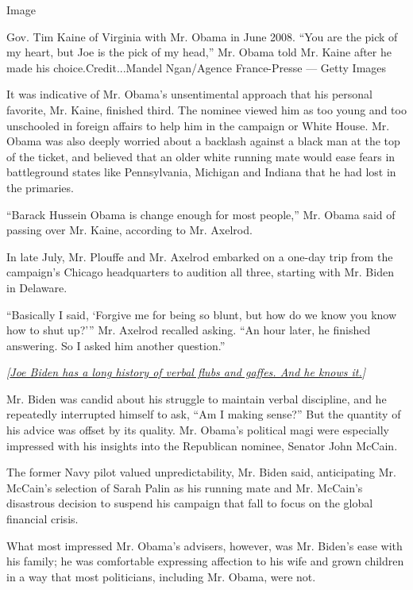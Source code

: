 Image

Gov. Tim Kaine of Virginia with Mr. Obama in June 2008. ``You are the
pick of my heart, but Joe is the pick of my head,'' Mr. Obama told Mr.
Kaine after he made his choice.Credit...Mandel Ngan/Agence France-Presse
--- Getty Images

It was indicative of Mr. Obama's unsentimental approach that his
personal favorite, Mr. Kaine, finished third. The nominee viewed him as
too young and too unschooled in foreign affairs to help him in the
campaign or White House. Mr. Obama was also deeply worried about a
backlash against a black man at the top of the ticket, and believed that
an older white running mate would ease fears in battleground states like
Pennsylvania, Michigan and Indiana that he had lost in the primaries.

``Barack Hussein Obama is change enough for most people,'' Mr. Obama
said of passing over Mr. Kaine, according to Mr. Axelrod.

In late July, Mr. Plouffe and Mr. Axelrod embarked on a one-day trip
from the campaign's Chicago headquarters to audition all three, starting
with Mr. Biden in Delaware.

``Basically I said, `Forgive me for being so blunt, but how do we know
you know how to shut up?''' Mr. Axelrod recalled asking. ``An hour
later, he finished answering. So I asked him another question.''

\emph{{[}}\href{https://www.nytimes.com/2019/08/12/us/politics/joe-biden-gaffes.html?action=click\&module=Intentional\&pgtype=Article}{\emph{Joe
Biden has a long history of verbal flubs and gaffes. And he knows
it.}}\emph{{]}}

Mr. Biden was candid about his struggle to maintain verbal discipline,
and he repeatedly interrupted himself to ask, ``Am I making sense?'' But
the quantity of his advice was offset by its quality. Mr. Obama's
political magi were especially impressed with his insights into the
Republican nominee, Senator John McCain.

The former Navy pilot valued unpredictability, Mr. Biden said,
anticipating Mr. McCain's selection of Sarah Palin as his running mate
and Mr. McCain's disastrous decision to suspend his campaign that fall
to focus on the global financial crisis.

What most impressed Mr. Obama's advisers, however, was Mr. Biden's ease
with his family; he was comfortable expressing affection to his wife and
grown children in a way that most politicians, including Mr. Obama, were
not.

